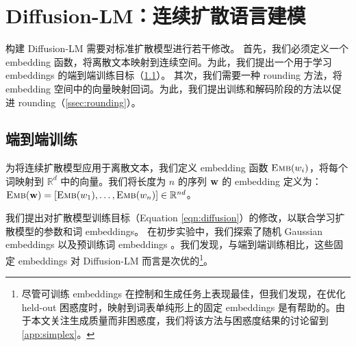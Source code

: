 \vspace{-2mm}
\section{Diffusion-LM：连续扩散语言建模}
\vspace{-2mm}
\label{sec:method}

构建 Diffusion-LM 需要对标准扩散模型进行若干修改。
首先，我们必须定义一个 embedding 函数，将离散文本映射到连续空间。为此，我们提出一个用于学习 embeddings 的端到端训练目标（\cref{ssec:embeddings}）。
其次，我们需要一种 rounding 方法，将 embedding 空间中的向量映射回词。为此，我们提出训练和解码阶段的方法以促进 rounding（\cref{ssec:rounding}）。








\vspace{-2mm}
\subsection{端到端训练} 
\label{ssec:embeddings}


为将连续扩散模型应用于离散文本，我们定义 embedding 函数 $\textsc{Emb}(w_i)$，将每个词映射到 $\mathbb{R}^{d}$ 中的向量。我们将长度为 $n$ 的序列 $\mathbf{w}$ 的 embedding 定义为：$\textsc{Emb}(\mathbf{w}) = [\textsc{Emb}(w_1), \dots, \textsc{Emb}(w_n)] \in \mathbb{R}^{nd}$。

我们提出对扩散模型训练目标（Equation \ref{eqn:diffusion}）的修改，以联合学习扩散模型的参数和词 embeddings。
在初步实验中，我们探索了随机 Gaussian embeddings 以及预训练词 embeddings \cite{pennington-etal-2014-glove, radford2019language}。我们发现，与端到端训练相比，这些固定 embeddings 对 Diffusion-LM 而言是次优的\footnote{尽管可训练 embeddings 在控制和生成任务上表现最佳，但我们发现，在优化 held-out 困惑度时，映射到词表单纯形上的固定 embeddings 是有帮助的。由于本文关注生成质量而非困惑度，我们将该方法与困惑度结果的讨论留到 \cref{app:simplex}。}。


